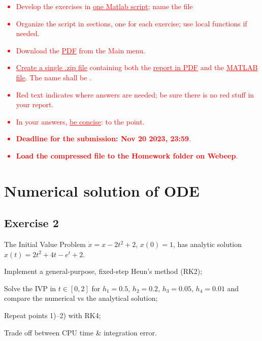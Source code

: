 \documentclass[11pt,a4paper,oneside]{article}
\newcommand{\tr}{\textcolor{red}}
\begin{document}


\tr{
\begin{itemize}
\item Develop the exercises in \underline{one Matlab script}; name the file 
\item Organize the script in sections, one for each exercise; use local functions if needed. 
\item Download the \underline{PDF} from the Main menu.
\item \underline{Create a single .zip file} containing both the \underline{report in PDF} and the \underline{MATLAB file}. The name shall be .
\item Red text indicates where answers are needed; be sure there is no red stuff in your report.
\item In your answers, \underline{be concise}: to the point.
\item \textbf{Deadline for the submission: Nov 20 2023, 23:59}.
\item \textbf{Load the compressed file to the Homework folder on Webeep}.
\end{itemize}
}





\clearpage


\section{Numerical solution of ODE}
\subsection*{Exercise 2}

The Initial Value Problem $\dot x = x- 2t^2+2$, $x(0) = 1$, has analytic solution $x(t) = 2t^2 + 4t - e^t + 2$. 
\begin{enumerate*}[label=\arabic*)]
    \item Implement a general-purpose, fixed-step Heun's method (RK2);
    \item Solve the IVP in $t\in[0,2]$ for $h_1 = 0.5$, $h_2 = 0.2$, $h_3 = 0.05$, $h_4 = 0.01$ and compare the numerical vs the analytical solution;
    \item Repeat points 1)--2) with RK4;
    \item Trade off between CPU time \& integration error.
\end{enumerate*}
\end{document}
